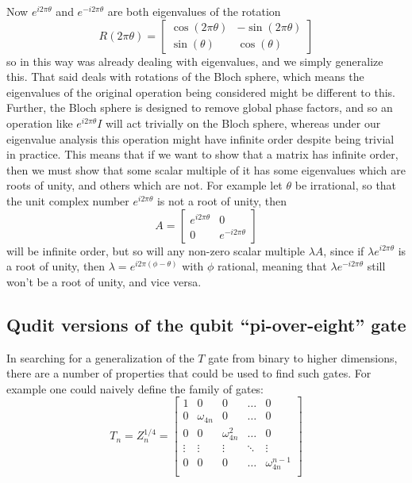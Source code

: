 Now $e^{i 2\pi\theta}$ and $e^{-i 2\pi\theta}$ are both eigenvalues of the rotation
\[R(2\pi \theta) = \left[\begin{matrix}
\cos(2\pi\theta) & -\sin(2\pi\theta) \\
\sin(\theta) & \cos(\theta)
\end{matrix}\right]\]
so in this way \cite{universal-qubit} was already dealing with eigenvalues, and we simply generalize this. That said \cite{universal-qubit} deals with rotations of the Bloch sphere, which means the eigenvalues of the original operation being considered might be different to this. Further, the Bloch sphere is designed to remove global phase factors, and so an operation like $e^{i2\pi\theta}I$ will act trivially on the Bloch sphere, whereas under our eigenvalue analysis this operation might have infinite order despite being trivial in practice. This means that if we want to show that a matrix has infinite order, then we must show that some scalar multiple of it has some eigenvalues which are roots of unity, and others which are not. For example let $\theta$ be irrational, so that the unit complex number $e^{i2\pi\theta}$ is not a root of unity, then
\[A = \left[\begin{matrix}
e^{i2\pi\theta} & 0 \\
0 & e^{-i2\pi\theta}
\end{matrix}\right]\]
will be infinite order, but so will any non-zero scalar multiple $\lambda A$, since if $\lambda e^{i2\pi\theta}$ is a root of unity, then $\lambda = e^{i2\pi(\phi - \theta)}$ with $\phi$ rational, meaning that $\lambda e^{-i2\pi\theta}$ still won't be a root of unity, and vice versa.
\subsection{Qudit versions of the qubit ``pi-over-eight'' gate}
In searching for a generalization of the $T$ gate from binary to higher dimensions, there are a number of properties that could be used to find such gates. For example one could naively define the family of gates:
\[T_n = Z_n^{1/4} = \left[\begin{matrix}
1 & 0 & 0 & \dots & 0 \\
0 & \omega_{4n} & 0 & \dots & 0 \\
0 & 0 & \omega_{4n}^2 & \dots & 0 \\
\vdots & \vdots & \vdots & \ddots & \vdots \\
0 & 0 & 0 & \dots & \omega_{4n}^{n-1} \\
\end{matrix}\right]\]

